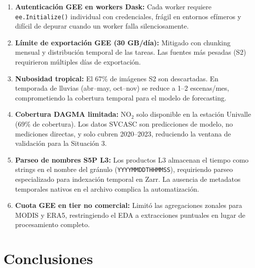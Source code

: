 \documentclass[10pt,a4paper,twocolumn]{article}
\begin{document}
\begin{enumerate}[nosep, leftmargin=*, itemsep=2pt]
  \item \textbf{Autenticación GEE en workers Dask:} Cada worker requiere \texttt{ee.Initialize()} individual con credenciales, frágil en entornos efímeros y difícil de depurar cuando un worker falla silenciosamente.
  \item \textbf{Límite de exportación GEE (30 GB/día):} Mitigado con chunking mensual y distribución temporal de las tareas. Las fuentes más pesadas (S2) requirieron múltiples días de exportación.
  \item \textbf{Nubosidad tropical:} El 67\% de imágenes S2 son descartadas. En temporada de lluvias (abr--may, oct--nov) se reduce a 1--2 escenas/mes, comprometiendo la cobertura temporal para el modelo de forecasting.
  \item \textbf{Cobertura DAGMA limitada:} NO$_2$ solo disponible en la estación Univalle (69\% de cobertura). Los datos SVCASC son predicciones de modelo, no mediciones directas, y solo cubren 2020--2023, reduciendo la ventana de validación para la Situación 3.
  \item \textbf{Parseo de nombres S5P L3:} Los productos L3 almacenan el tiempo como strings en el nombre del gránulo (\texttt{YYYYMMDDTHHMMSS}), requiriendo parseo especializado para indexación temporal en Zarr. La ausencia de metadatos temporales nativos en el archivo complica la automatización.
  \item \textbf{Cuota GEE en tier no comercial:} Limitó las agregaciones zonales para MODIS y ERA5, restringiendo el EDA a extracciones puntuales en lugar de procesamiento completo.
\end{enumerate}

\section{Conclusiones}
\end{document}
